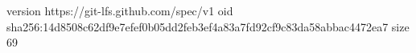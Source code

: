 version https://git-lfs.github.com/spec/v1
oid sha256:14d8508c62df9e7efef0b05dd2feb3ef4a83a7fd92cf9c83da58abbac4472ea7
size 69
